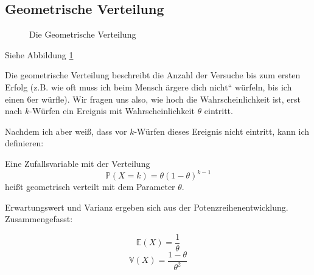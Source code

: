 {    \subsection{Geometrische Verteilung}
    \label{sec:geometrische_verteilung}
    {
        \begin{figure}
            \def\nval{10}
            \def\pvala{0.8}
            \def\pvalb{0.5}
            \def\pvalc{0.2}
            \subfigure[Wahrscheinlichkeitsfunktion]{
                \begin{tikzpicture}
                                
                \end{tikzpicture}
                \label{fig:geomet_dist_a}
            }
            \caption{Die Geometrische Verteilung}
            \label{fig:geomet_dist}
        \end{figure}
    }

    Siehe Abbildung \ref{fig:geomet_dist}

    \begin{bsp}
    Die geometrische Verteilung beschreibt die Anzahl der Versuche bis zum
    ersten Erfolg (z.B. wie oft muss ich beim {\quotedblbase}Mensch ärgere
    dich nicht{\textquotedblleft} würfeln, bis ich einen 6er würfle). Wir
    fragen uns also, wie hoch die Wahrscheinlichkeit ist, erst nach
    $k$-Würfen ein Ereignis mit Wahrscheinlichkeit $\theta $ eintritt.
    \end{bsp}

    Nachdem ich aber weiß, dass vor $k$-Würfen dieses Ereignis nicht eintritt,
    kann ich definieren:

    \begin{definition}
    Eine Zufallsvariable mit der Verteilung
    \[\mathbb P\left(X=k\right)=\theta \left(1-\theta \right)^{k-1} \]
    heißt geometrisch verteilt mit dem Parameter $\theta$.

    Erwartungswert und Varianz ergeben sich aus der Potenzreihenentwicklung.
    Zusammengefasst:

    \[
    \mathbb E\left(X\right)=\frac{1}{\theta }
    \]
    \[
    \mathbb V\left(X\right)=\frac{1-\theta }{\theta ^{2}}
    \]


\end{definition}}
